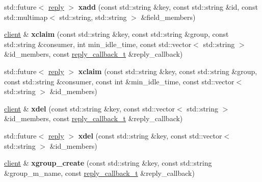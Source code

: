 \begin{DoxyCompactItemize}
std\+::future$<$ \mbox{\hyperlink{classcpp__redis_1_1reply}{reply}} $>$ {\bfseries xadd} (const std\+::string \&key, const std\+::string \&id, const std\+::multimap$<$ std\+::string, std\+::string $>$ \&field\+\_\+members)
\item 
\mbox{\label{classcpp__redis_1_1client_a1c8ca282fc8a80860a7a2c56761debf4}} 
\mbox{\hyperlink{classcpp__redis_1_1client}{client}} \& {\bfseries xclaim} (const std\+::string \&key, const std\+::string \&group, const std\+::string \&consumer, int min\+\_\+idle\+\_\+time, const std\+::vector$<$ std\+::string $>$ \&id\+\_\+members, const \mbox{\hyperlink{classcpp__redis_1_1client_af7a65eb21aa25230bfbb0b0203c4fc04}{reply\+\_\+callback\+\_\+t}} \&reply\+\_\+callback)
\item 
\mbox{\label{classcpp__redis_1_1client_a9788600c1ee887faa49c68b4ae6a6264}} 
std\+::future$<$ \mbox{\hyperlink{classcpp__redis_1_1reply}{reply}} $>$ {\bfseries xclaim} (const std\+::string \&key, const std\+::string \&group, const std\+::string \&consumer, const int \&min\+\_\+idle\+\_\+time, const std\+::vector$<$ std\+::string $>$ \&id\+\_\+members)
\item 
\mbox{\label{classcpp__redis_1_1client_aa04efdc16fc8cf62c6d2fafa45865a06}} 
\mbox{\hyperlink{classcpp__redis_1_1client}{client}} \& {\bfseries xdel} (const std\+::string \&key, const std\+::vector$<$ std\+::string $>$ \&id\+\_\+members, const \mbox{\hyperlink{classcpp__redis_1_1client_af7a65eb21aa25230bfbb0b0203c4fc04}{reply\+\_\+callback\+\_\+t}} \&reply\+\_\+callback)
\item 
\mbox{\label{classcpp__redis_1_1client_aa745d6ed2ed3d4fd17d76961570fbe43}} 
std\+::future$<$ \mbox{\hyperlink{classcpp__redis_1_1reply}{reply}} $>$ {\bfseries xdel} (const std\+::string \&key, const std\+::vector$<$ std\+::string $>$ \&id\+\_\+members)
\item 
\mbox{\label{classcpp__redis_1_1client_a5285eae63adbf09478d0214767363714}} 
\mbox{\hyperlink{classcpp__redis_1_1client}{client}} \& {\bfseries xgroup\+\_\+create} (const std\+::string \&key, const std\+::string \&group\+\_\+m_name, const \mbox{\hyperlink{classcpp__redis_1_1client_af7a65eb21aa25230bfbb0b0203c4fc04}{reply\+\_\+callback\+\_\+t}} \&reply\+\_\+callback)

\end{DoxyCompactItemize}
